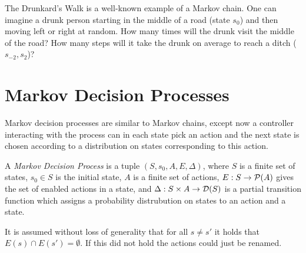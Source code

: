 \begin{example} The Drunkard's Walk is a well-known example of a Markov
    chain. One can imagine a drunk person starting in the middle of a road
    (state $s_0$) and then moving left or right at random. How many times
    will the drunk visit the middle of the road? How many steps will it
    take the drunk on average to reach a ditch ($s_{-2}, s_2$)?

\hfill \break
\centering
{}
\end{example}

\section{Markov Decision Processes}

Markov decision processes are similar to Markov chains, except now a
controller interacting with the process can in each state pick an action
and the next state is chosen according to a distribution on states
corresponding to this action.

\begin{definition}
A {\em Markov Decision Process} is a tuple $(S, s_0, A, E, \Delta)$, where
$S$ is a finite set of states,
$s_0 \in S$ is the initial state,
$A$ is a finite set of actions,
$E : S \to \mathcal{P}(A)$ gives the set of enabled actions in a state,
and $\Delta : S \times A \to \mathcal{D}(S)$ is a partial transition
function which assigns a probability distrubution on states to an action
and a state.

It is assumed without loss of generality that for all $s \neq s'$ it
holds that $E(s) \cap E(s') = \emptyset$. If this did not hold the
actions could just be renamed.
\end{definition}

